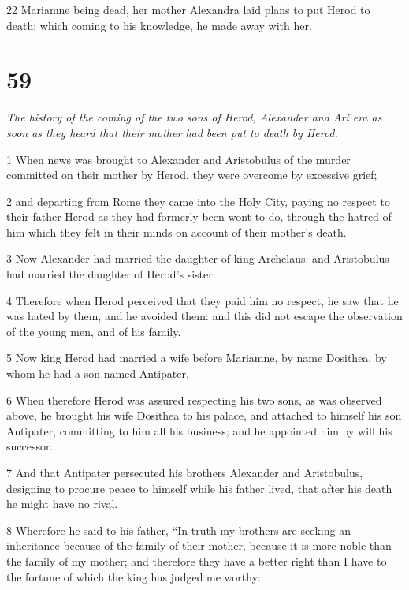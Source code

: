 \par 22 Mariamne being dead, her mother Alexandra laid plans to put Herod to death; which coming to his knowledge, he made away with her. 

\chapter{59}

\par \textit{The history of the coming of the two sons of Herod, Alexander and Ari era as soon as they heard that their mother had been put to death by Herod.}

\par 1 When news was brought to Alexander and Aristobulus of the murder committed on their mother by Herod, they were overcome by excessive grief; 

\par 2 and departing from Rome they came into the Holy City, paying no respect to their father Herod as they had formerly been wont to do, through the hatred of him which they felt in their minds on account of their mother’s death. 

\par 3 Now Alexander had married the daughter of king Archelaus: and Aristobulus had married the daughter of Herod’s sister. 

\par 4 Therefore when Herod perceived that they paid him no respect, he saw that he was hated by them, and he avoided them: and this did not escape the observation of the young men, and of his family. 

\par 5 Now king Herod had married a wife before Mariamne, by name Dosithea, by whom he had a son named Antipater. 

\par 6 When therefore Herod was assured respecting his two sons, as was observed above, he brought his wife Dosithea to his palace, and attached to himself his son Antipater, committing to him all his business; and he appointed him by will his successor. 

\par 7 And that Antipater persecuted his brothers Alexander and Aristobulus, designing to procure peace to himself while his father lived, that after his death he might have no rival. 

\par 8 Wherefore he said to his father, “In truth my brothers are seeking an inheritance because of the family of their mother, because it is more noble than the family of my mother; and therefore they have a better right than I have to the fortune of which the king has judged me worthy: 

